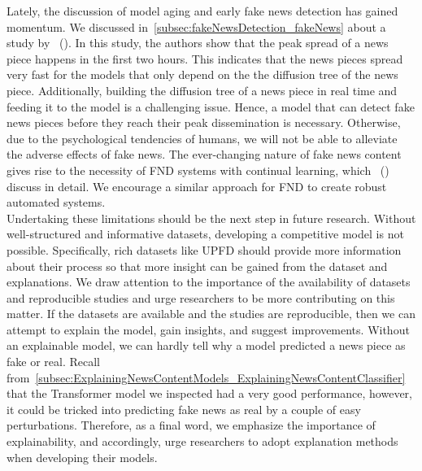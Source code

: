Lately, the discussion of model aging and early fake news detection has gained momentum. We discussed in~\ref{subsec:fakeNewsDetection_fakeNews} about a study by~\citeauthor{FakeNewsDetectionUsingGeometricDeepLearning_Monti} (\citeyear{FakeNewsDetectionUsingGeometricDeepLearning_Monti}). In this study, the authors show that the peak spread of a news piece happens in the first two hours. This indicates that the news pieces spread very fast for the models that only depend on the the diffusion tree of the news piece. Additionally, building the diffusion tree of a news piece in real time and feeding it to the model is a challenging issue. Hence, a model that can detect fake news pieces before they reach their peak dissemination is necessary. Otherwise, due to the psychological tendencies of humans, we will not be able to alleviate the adverse effects of fake news. The ever-changing nature of fake news content gives rise to the necessity of FND systems with continual learning, which~\citeauthor{GraphNeuralNetworksWithContinualLearningFakeNewsDetection_Han} (\citeyear{GraphNeuralNetworksWithContinualLearningFakeNewsDetection_Han}) discuss in detail. We encourage a similar approach for FND to create robust automated systems.\\
Undertaking these limitations should be the next step in future research. Without well-structured and informative datasets, developing a competitive model is not possible. Specifically, rich datasets like UPFD should provide more information about their process so that more insight can be gained from the dataset and explanations. We draw attention to the importance of the availability of datasets and reproducible studies and urge researchers to be more contributing on this matter. If the datasets are available and the studies are reproducible, then we can attempt to explain the model, gain insights, and suggest improvements. Without an explainable model, we can hardly tell why a model predicted a news piece as fake or real. Recall from~\ref{subsec:ExplainingNewsContentModels_ExplainingNewsContentClassifier} that the Transformer model we inspected had a very good performance, however, it could be tricked into predicting fake news as real by a couple of easy perturbations. Therefore, as a final word, we emphasize the importance of explainability, and accordingly, urge researchers to adopt explanation methods when developing their models.